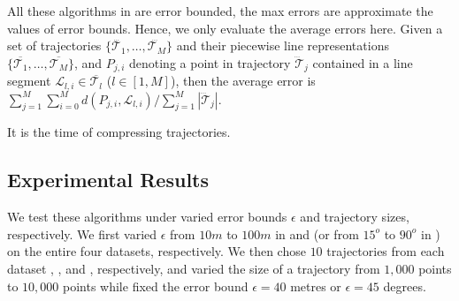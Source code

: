 All these algorithms in  are error bounded, \ie the max errors are approximate the values of error bounds. Hence, we only evaluate the average errors here. Given a set of trajectories $\{\dddot{\mathcal{T}_1}, \ldots, \dddot{\mathcal{T}_M}\}$ and their piecewise line representations
$\{\overline{\mathcal{T}_1}, \ldots, \overline{\mathcal{T}_M}\}$, and $P_{j,i}$ denoting
a point in trajectory $\dddot{\mathcal{T}}_j$ contained in a line segment $\mathcal{L}_{l,i}\in\overline{\mathcal{T}_l}$ ($l\in[1,M]$),
then the average error is $\sum_{j=1}^{M}\sum_{i=0}^{M} d(P_{j,i},
\mathcal{L}_{l,i})/\sum_{j=1}^{M}{|\dddot{\mathcal{T}}_j |}$.

It is the time of compressing trajectories.

\subsection{Experimental Results}
We test these algorithms under varied error bounds $\epsilon$ and trajectory sizes, respectively. We first varied $\epsilon$ from $10m$ to $100m$ in \ped and \sed (or from $15^o$ to $90^o$ in \dad) on the entire four datasets, respectively. We then chose $10$ trajectories from each dataset \taxi, \ucar, \geolife and \mopsi, respectively, and varied the size  of a trajectory from $1,000$ points to $10,000$ points while fixed the error bound $\epsilon=40$ metres or $\epsilon=45$ degrees.


